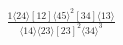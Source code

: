 \documentclass[varwidth, border=5pt]{standalone}
\begin{document}
\begin{my}
$\begin{gathered}
\scriptscriptstyle\frac{1⟨24⟩[12]⟨45⟩^2[34]⟨13⟩}{⟨14⟩⟨23⟩[23]^2⟨34⟩^3}
\end{gathered}$
\end{my}
\end{document}
